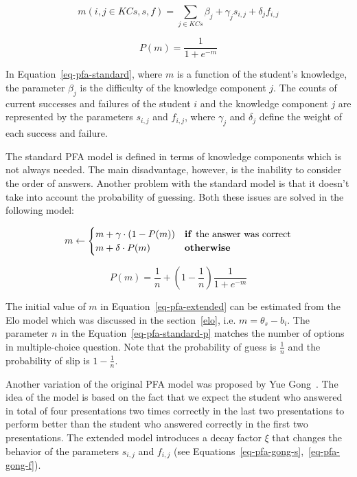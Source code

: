 \begin{equation} \label{eq-pfa-standard}
  m(i,j \in KCs,s,f) = \sum_{j \in KCs} \beta_j + \gamma_j s_{i,j} + \delta_j f_{i,j} 
\end{equation}

\begin{equation} \label{eq-pfa-standard-p}
  P(m) = \frac{1}{1 + e^{-m}}
\end{equation}

In Equation~\ref{eq-pfa-standard}, where $m$ is a function of the student's knowledge, the parameter $\beta_j$ is the difficulty of the knowledge component $j$. The counts of current successes and failures of the student $i$ and the knowledge component $j$ are represented by the parameters $s_{i,j}$ and $f_{i,j}$, where $\gamma_j$ and $\delta_j$ define the weight of each success and failure.

The standard PFA model is defined in terms of knowledge components which is not always needed. The main disadvantage, however, is the inability to consider the order of answers. Another problem with the standard model is that it doesn't take into account the probability of guessing. Both these issues are solved in the following model:

\begin{equation} \label{eq-pfa-extended}
  m \gets \begin{cases}
            m + \gamma \cdot (1 - P(m)) & \text{\textbf{if }} \text{the answer was correct} \\
            m + \delta \cdot P(m) & \text{\textbf{otherwise}}
          \end{cases}
\end{equation}

\begin{equation} \label{eq-pfa-standard-p}
  P(m) = \frac{1}{n} + \left(1 - \frac{1}{n}\right)\frac{1}{1 + e^{-m}}
\end{equation}

The initial value of $m$ in Equation~\ref{eq-pfa-extended} can be estimated from the Elo model which was discussed in the section~\ref{elo}, i.e. $m = \theta_s - b_i$. The parameter $n$ in the Equation~\ref{eq-pfa-standard-p} matches the number of options in multiple-choice question. Note that the probability of guess is $\frac{1}{n}$ and the probability of slip is $1 - \frac{1}{n}$.

Another variation of the original PFA model was proposed by Yue Gong~\cite{Gong2011}. The idea of the model is based on the fact that we expect the student who answered in total of four presentations two times correctly in the last two presentations to perform better than the student who answered correctly in the first two presentations. The extended model introduces a decay factor $\xi$ that changes the behavior of the parameters $s_{i,j}$ and $f_{i,j}$ (see Equations~\ref{eq-pfa-gong-s},~\ref{eq-pfa-gong-f}).

